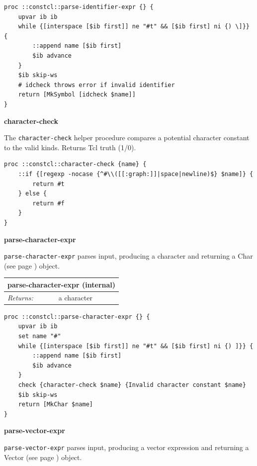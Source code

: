 \documentclass[twoside,9pt]{report}
\begin{document}
\noindent\makebox[\linewidth]{\rule{\linewidth}{0.4pt}}
\begin{lstlisting}
proc ::constcl::parse-identifier-expr {} {
    upvar ib ib
    while {[interspace [$ib first]] ne "#t" && [$ib first] ni {) \]}} {
        ::append name [$ib first]
        $ib advance
    }
    $ib skip-ws
    # idcheck throws error if invalid identifier
    return [MkSymbol [idcheck $name]]
}
\end{lstlisting}
\noindent\makebox[\linewidth]{\rule{\linewidth}{0.4pt}}

\textbf{character-check}


The \texttt{character-check} helper procedure compares a potential character constant to the valid kinds. Returns Tcl truth (1/0).

\noindent\makebox[\linewidth]{\rule{\linewidth}{0.4pt}}
\begin{lstlisting}
proc ::constcl::character-check {name} {
    ::if {[regexp -nocase {^#\\([[:graph:]]|space|newline)$} $name]} {
        return #t
    } else {
        return #f
    }
}
\end{lstlisting}
\noindent\makebox[\linewidth]{\rule{\linewidth}{0.4pt}}

\textbf{parse-character-expr}


\texttt{parse-character-expr} parses input, producing a character and returning a Char (see page \pageref{characters}) object.

\begin{tabular}{ |l l| }
\hline
\multicolumn{2}{|l|}{parse-character-expr (internal)} \\
\hline
\textit{Returns:} & a character \\
\hline
\end{tabular}

\noindent\makebox[\linewidth]{\rule{\linewidth}{0.4pt}}
\begin{lstlisting}
proc ::constcl::parse-character-expr {} {
    upvar ib ib
    set name "#"
    while {[interspace [$ib first]] ne "#t" && [$ib first] ni {) ]}} {
        ::append name [$ib first]
        $ib advance
    }
    check {character-check $name} {Invalid character constant $name}
    $ib skip-ws
    return [MkChar $name]
}
\end{lstlisting}
\noindent\makebox[\linewidth]{\rule{\linewidth}{0.4pt}}

\textbf{parse-vector-expr}


\texttt{parse-vector-expr} parses input, producing a vector expression and returning a Vector (see page \pageref{vectors}) object.
\end{document}
